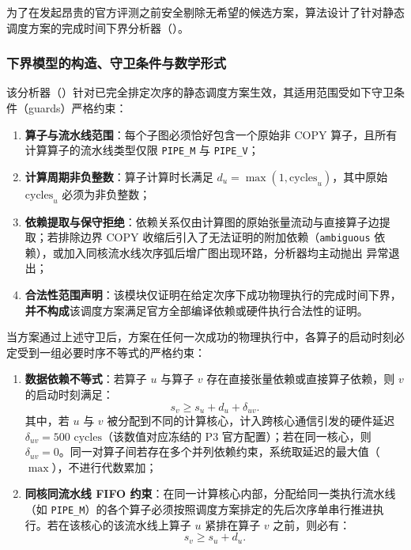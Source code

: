 \documentclass[anonymous,withtoc]{gmcm2026}
\providecommand{\tightlist}{\setlength{\itemsep}{0pt}\setlength{\parskip}{0pt}}
\begin{document}
为了在发起昂贵的官方评测之前安全剔除无希望的候选方案，算法设计了针对静态调度方案的完成时间下界分析器（\texttt{}）。

\subsubsection{下界模型的构造、守卫条件与数学形式}

该分析器（\texttt{}）针对已完全排定次序的静态调度方案生效，其适用范围受如下守卫条件（guards）严格约束：

\begin{enumerate}
\def\labelenumi{\arabic{enumi}.}
\tightlist
\item
  \textbf{算子与流水线范围}：每个子图必须恰好包含一个原始非 COPY 算子，且所有计算算子的流水线类型仅限 \texttt{PIPE\_M} 与 \texttt{PIPE\_V}；
\item
  \textbf{计算周期非负整数}：算子计算时长满足 \(d_u = \max(1, \text{cycles}_u)\)，其中原始 \(\text{cycles}_u\) 必须为非负整数；
\item
  \textbf{依赖提取与保守拒绝}：依赖关系仅由计算图的原始张量流动与直接算子边提取；若排除边界 COPY 收缩后引入了无法证明的附加依赖（\texttt{ambiguous} 依赖），或加入同核流水线次序弧后增广图出现环路，分析器均主动抛出 \texttt{} 异常退出；
\item
  \textbf{合法性范围声明}：该模块仅证明在给定次序下成功物理执行的完成时间下界，\textbf{并不构成}该调度方案满足官方全部编译依赖或硬件执行合法性的证明。
\end{enumerate}

当方案通过上述守卫后，方案在任何一次成功的物理执行中，各算子的启动时刻必定受到一组必要时序不等式的严格约束：

\begin{enumerate}
\def\labelenumi{\arabic{enumi}.}
\tightlist
\item
  \textbf{数据依赖不等式}：若算子 \(u\) 与算子 \(v\) 存在直接张量依赖或直接算子依赖，则 \(v\) 的启动时刻满足： \begin{equation}
s_v \ge s_u + d_u + \delta_{uv}.
\end{equation} 其中，若 \(u\) 与 \(v\) 被分配到不同的计算核心，计入跨核心通信引发的硬件延迟 \(\delta_{uv} = 500\text{ cycles}\)（该数值对应冻结的 P3 官方配置）；若在同一核心，则 \(\delta_{uv} = 0\)。同一对算子间若存在多个并列依赖约束，系统取延迟的最大值（\(\max\)），不进行代数累加；
\item
  \textbf{同核同流水线 FIFO 约束}：在同一计算核心内部，分配给同一类执行流水线（如 \texttt{PIPE\_M}）的各个算子必须按照调度方案排定的先后次序单串行推进执行。若在该核心的该流水线上算子 \(u\) 紧排在算子 \(v\) 之前，则必有： \begin{equation}
s_v \ge s_u + d_u.
\end{equation}
\end{enumerate}
\end{document}
